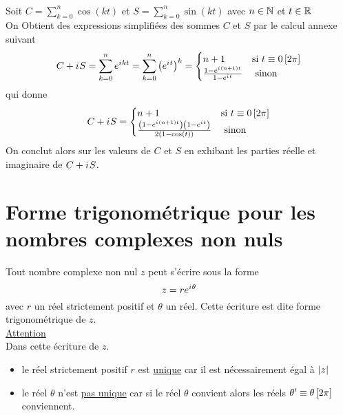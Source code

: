 \begin{appl}
	~\\
	Soit \(C = \sum_{k=0}^n \cos(kt)\) et \(S = \sum_{k=0}^n \sin(kt)\) avec \(n \in \mathbb{N}\) et \(t \in \mathbb{R}\)\\
	On Obtient des expressions simplifiées des sommes \(C\) et \(S\) par le calcul annexe suivant
	\[C+i\mkern1mu S = \sum_{k=0}^n e^{i\mkern1mu kt} = \sum_{k=0}^n \left(e^{i\mkern1mu t}\right)^k =
		\begin{cases}
			n+1                               & \text{si } t\equiv 0\left[2 \pi\right] \\
			\frac{1-e^{i\mkern1mu(n+1)t}}{1-e^{i\mkern1mu t}} & \text{ sinon }
		\end{cases}
	\]
	qui donne \[C+i\mkern1mu S = \begin{cases}
			n+1                                                                       & \text{si } t\equiv 0\left[2 \pi\right] \\
			\frac{\left(1-e^{i\mkern1mu(n+1)t}\right)\left(1-e^{i\mkern1mu t}\right)}{2\left(1-\cos\left(t\right)\right)} & \text{ sinon }
		\end{cases} \]
	On conclut alors sur les valeurs de \(C\) et \(S\) en exhibant les parties réelle et imaginaire de \(C + i\mkern1mu S\).
\end{appl}

\section{Forme trigonométrique pour les nombres complexes non nuls}

\begin{defprop}
	Tout nombre complexe non nul \(z\) peut s’écrire sous la forme \[ z = re^{i\mkern1mu \theta}\]
	avec \(r\) un réel strictement positif et \(\theta\) un réel. Cette écriture est dite forme trigonométrique de \(z\). \\
	\underline{Attention} \\
	Dans cette écriture de \(z\).
	\begin{itemize}
		\item le réel strictement positif \(r\) est \underline{unique} car il est nécessairement égal à \(\left\lvert z\right\rvert\)
		\item le réel \(\theta\) n'est \underline{pas unique} car si le réel \(\theta\) convient alors les réels \(\theta ' \equiv \theta \left[2 \pi\right]\) conviennent.
	\end{itemize}
\end{defprop}

